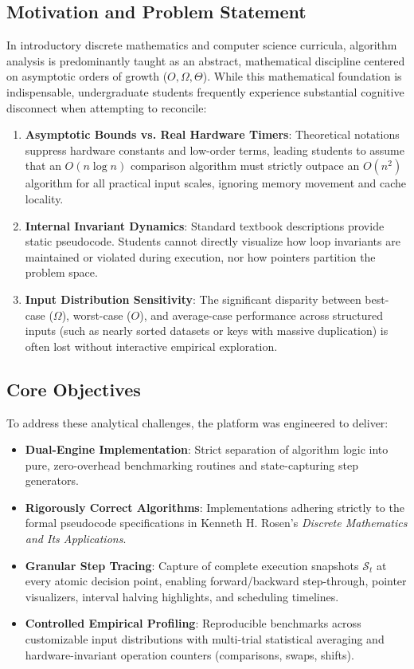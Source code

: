 \documentclass[11pt,a4paper]{article}
\theoremstyle{definition}
\theoremstyle{plain}
\theoremstyle{remark}
\begin{document}
\subsection{Motivation and Problem Statement}
In introductory discrete mathematics and computer science curricula, algorithm analysis is predominantly taught as an abstract, mathematical discipline centered on asymptotic orders of growth ($O, \Omega, \Theta$). While this mathematical foundation is indispensable, undergraduate students frequently experience substantial cognitive disconnect when attempting to reconcile:
\begin{enumerate}[label=(\roman*)]
    \item \textbf{Asymptotic Bounds vs. Real Hardware Timers}: Theoretical notations suppress hardware constants and low-order terms, leading students to assume that an $O(n \log n)$ comparison algorithm must strictly outpace an $O(n^2)$ algorithm for all practical input scales, ignoring memory movement and cache locality.
    \item \textbf{Internal Invariant Dynamics}: Standard textbook descriptions provide static pseudocode. Students cannot directly visualize how loop invariants are maintained or violated during execution, nor how pointers partition the problem space.
    \item \textbf{Input Distribution Sensitivity}: The significant disparity between best-case ($\Omega$), worst-case ($O$), and average-case performance across structured inputs (such as nearly sorted datasets or keys with massive duplication) is often lost without interactive empirical exploration.
\end{enumerate}

\subsection{Core Objectives}
To address these analytical challenges, the platform was engineered to deliver:
\begin{itemize}
    \item \textbf{Dual-Engine Implementation}: Strict separation of algorithm logic into pure, zero-overhead benchmarking routines and state-capturing step generators.
    \item \textbf{Rigorously Correct Algorithms}: Implementations adhering strictly to the formal pseudocode specifications in Kenneth H. Rosen's \textit{Discrete Mathematics and Its Applications}.
    \item \textbf{Granular Step Tracing}: Capture of complete execution snapshots $\mathcal{S}_t$ at every atomic decision point, enabling forward/backward step-through, pointer visualizers, interval halving highlights, and scheduling timelines.
    \item \textbf{Controlled Empirical Profiling}: Reproducible benchmarks across customizable input distributions with multi-trial statistical averaging and hardware-invariant operation counters (comparisons, swaps, shifts).
\end{itemize}
\end{document}
